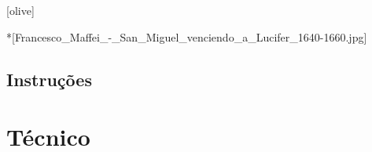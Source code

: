 
\newcommand{\subbooktitle}{Cura}





  
  \imprintpage

  \toc

  \setcounter{chapter}{0}

    \begin{songs}{}
      
    \end{songs}

    \begin{songs}{}
      
    \end{songs}

  [olive]
    \begin{songs}{}
      
    \end{songs}

  *[Francesco_Maffei_-_San_Miguel_venciendo_a_Lucifer_1640-1660.jpg]
    \section{Instruções}
        
      \begin{songs}{}
        
      \end{songs}
      \begin{songs}{}
        
      \end{songs}
      \begin{songs}{}
        
      \end{songs}

  \appendix

  \ifchorded
    \chapter{Técnico}
      
  \fi


